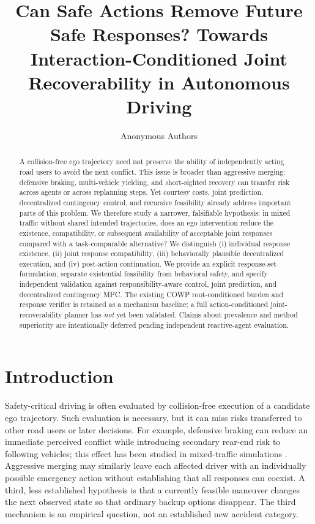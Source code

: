\documentclass[10pt]{article}
\title{Can Safe Actions Remove Future Safe Responses? Towards Interaction-Conditioned Joint Recoverability in Autonomous Driving}
\author{Anonymous Authors}
\date{}
\begin{document}
\maketitle

\begin{abstract}
A collision-free ego trajectory need not preserve the ability of independently acting road users to avoid the next conflict. This issue is broader than aggressive merging: defensive braking, multi-vehicle yielding, and short-sighted recovery can transfer risk across agents or across replanning steps. Yet courtesy costs, joint prediction, decentralized contingency control, and recursive feasibility already address important parts of this problem. We therefore study a narrower, falsifiable hypothesis: in mixed traffic without shared intended trajectories, does an ego intervention reduce the existence, compatibility, or subsequent availability of acceptable joint responses compared with a task-comparable alternative? We distinguish (i) individual response existence, (ii) joint response compatibility, (iii) behaviorally plausible decentralized execution, and (iv) post-action continuation. We provide an explicit response-set formulation, separate existential feasibility from behavioral safety, and specify independent validation against responsibility-aware control, joint prediction, and decentralized contingency MPC. The existing COWP root-conditioned burden and response verifier is retained as a mechanism baseline; a full action-conditioned joint-recoverability planner has \emph{not} yet been validated. Claims about prevalence and method superiority are intentionally deferred pending independent reactive-agent evaluation.
\end{abstract}

\section{Introduction}
\label{sec:introduction}
Safety-critical driving is often evaluated by collision-free execution of a candidate ego trajectory. Such evaluation is necessary, but it can miss risks transferred to other road users or later decisions. For example, defensive braking can reduce an immediate perceived conflict while introducing secondary rear-end risk to following vehicles; this effect has been studied in mixed-traffic simulations \parencite{liu2025secondary}. Aggressive merging may similarly leave each affected driver with an individually possible emergency action without establishing that all responses can coexist. A third, less established hypothesis is that a currently feasible maneuver changes the next observed state so that ordinary backup options disappear. The third mechanism is an empirical question, not an established new accident category.
\end{document}

